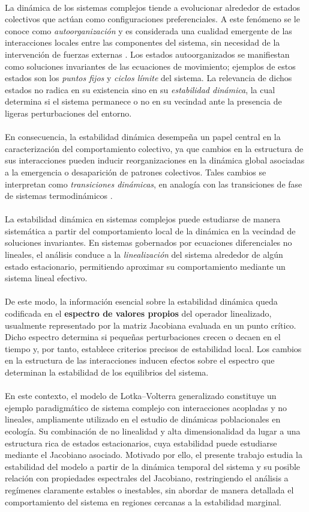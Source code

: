 \\
La dinámica de los sistemas complejos tiende a evolucionar alrededor de estados colectivos que actúan como configuraciones preferenciales. A este fenómeno se le conoce como \textit{autoorganización}  y es considerada una cualidad emergente de las interacciones locales entre las componentes del sistema, sin necesidad de la intervención de fuerzas externas \cite{miramontes2005sistemas}. Los estados autoorganizados se manifiestan como soluciones invariantes de las ecuaciones de movimiento; ejemplos de estos estados son los \textit{puntos fijos} y \textit{ciclos límite} del sistema. La relevancia de dichos estados no radica en su existencia sino en su \textit{estabilidad dinámica}, la cual determina si el sistema permanece o no en su vecindad ante la presencia de ligeras perturbaciones del entorno.\\
\\
En consecuencia, la estabilidad dinámica desempeña un papel central en la caracterización del comportamiento colectivo, ya que cambios en la estructura de sus interacciones pueden inducir reorganizaciones en la dinámica global asociadas a la emergencia o desaparición de patrones colectivos. Tales cambios se interpretan como \textit{transiciones dinámicas}, en analogía con las transiciones de fase de sistemas termodinámicos \cite{strogatz2001nonlinear}.
\\
\\
La estabilidad dinámica en sistemas complejos puede estudiarse de manera sistemática a partir del comportamiento local de la dinámica en la vecindad de soluciones invariantes. En sistemas gobernados por ecuaciones diferenciales no lineales, el análisis conduce a la \textit{linealización} del sistema alrededor de algún estado estacionario, permitiendo aproximar su comportamiento mediante un sistema lineal efectivo.\\
\\
De este modo, la información esencial sobre la estabilidad dinámica queda codificada en el \textbf{espectro de valores propios} del operador linealizado, usualmente representado por la matriz Jacobiana evaluada en un punto crítico. Dicho espectro determina si pequeñas perturbaciones crecen o decaen en el tiempo y, por tanto, establece criterios precisos de estabilidad local. Los cambios en la estructura de las interacciones inducen efectos sobre el espectro que determinan la estabilidad de los equilibrios del sistema. \\
\\
En este contexto, el modelo de Lotka–Volterra generalizado constituye un ejemplo paradigmático de sistema complejo con interacciones acopladas y no lineales, ampliamente utilizado en el estudio de dinámicas poblacionales en ecología. Su combinación de no linealidad y alta dimensionalidad da lugar a una estructura rica de estados estacionarios, cuya estabilidad puede estudiarse mediante el Jacobiano asociado. Motivado por ello, el presente trabajo estudia la estabilidad del modelo a partir de la dinámica temporal del sistema y su posible relación con propiedades espectrales del Jacobiano, restringiendo el análisis a regímenes claramente estables o inestables, sin abordar de manera detallada el comportamiento del sistema en regiones cercanas a la estabilidad marginal.
